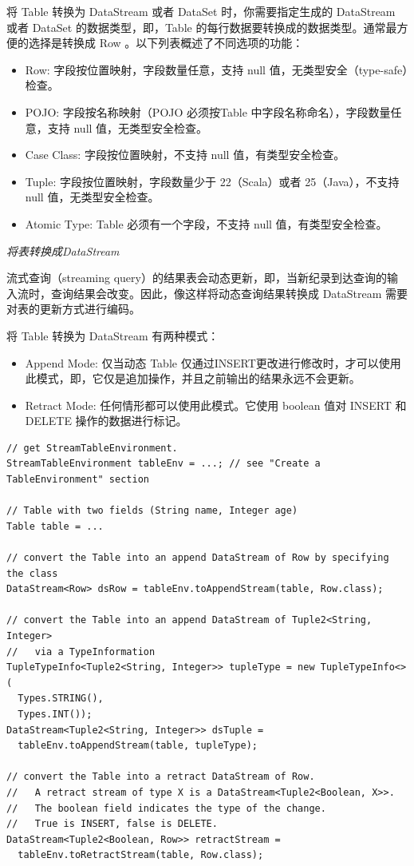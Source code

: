 \documentclass[cn,11pt,chinese]{elegantbook}
\begin{document}
将 Table 转换为 DataStream 或者 DataSet 时，你需要指定生成的 DataStream 或者 DataSet 的数据类型，即，Table 的每行数据要转换成的数据类型。通常最方便的选择是转换成 Row 。以下列表概述了不同选项的功能：

\begin{itemize}
    \item Row: 字段按位置映射，字段数量任意，支持 null 值，无类型安全（type-safe）检查。
    \item POJO: 字段按名称映射（POJO 必须按Table 中字段名称命名），字段数量任意，支持 null 值，无类型安全检查。
    \item Case Class: 字段按位置映射，不支持 null 值，有类型安全检查。
    \item Tuple: 字段按位置映射，字段数量少于 22（Scala）或者 25（Java），不支持 null 值，无类型安全检查。
    \item Atomic Type: Table 必须有一个字段，不支持 null 值，有类型安全检查。
\end{itemize}

\textit{将表转换成DataStream}

流式查询（streaming query）的结果表会动态更新，即，当新纪录到达查询的输入流时，查询结果会改变。因此，像这样将动态查询结果转换成 DataStream 需要对表的更新方式进行编码。

将 Table 转换为 DataStream 有两种模式：

\begin{itemize}
    \item Append Mode: 仅当动态 Table 仅通过INSERT更改进行修改时，才可以使用此模式，即，它仅是追加操作，并且之前输出的结果永远不会更新。
    \item Retract Mode: 任何情形都可以使用此模式。它使用 boolean 值对 INSERT 和 DELETE 操作的数据进行标记。
\end{itemize}

\begin{verbatim}
// get StreamTableEnvironment. 
StreamTableEnvironment tableEnv = ...; // see "Create a TableEnvironment" section

// Table with two fields (String name, Integer age)
Table table = ...

// convert the Table into an append DataStream of Row by specifying the class
DataStream<Row> dsRow = tableEnv.toAppendStream(table, Row.class);

// convert the Table into an append DataStream of Tuple2<String, Integer> 
//   via a TypeInformation
TupleTypeInfo<Tuple2<String, Integer>> tupleType = new TupleTypeInfo<>(
  Types.STRING(),
  Types.INT());
DataStream<Tuple2<String, Integer>> dsTuple = 
  tableEnv.toAppendStream(table, tupleType);

// convert the Table into a retract DataStream of Row.
//   A retract stream of type X is a DataStream<Tuple2<Boolean, X>>. 
//   The boolean field indicates the type of the change. 
//   True is INSERT, false is DELETE.
DataStream<Tuple2<Boolean, Row>> retractStream = 
  tableEnv.toRetractStream(table, Row.class);
\end{verbatim}
\end{document}
